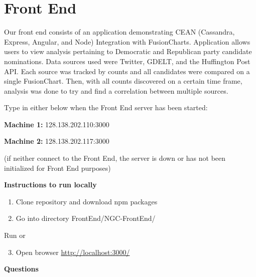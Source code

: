 \documentclass[letterpaper,12pt,english]{sphinxmanual}
\begin{document}
\section{Front End}
\label{frontEnd:front-end}\label{frontEnd::doc}
Our front end consists of an application demonstrating CEAN (Cassandra, Express, Angular, and Node) Integration with FusionCharts. Application allows users to view analysis pertaining to Democratic and Republican party candidate nominations. Data sources used were Twitter, GDELT, and the Huffington Post API. Each source was tracked by counts and all candidates were compared on a single FusionChart. Then, with all counts discovered on a certain time frame, analysis was done to try and find a correlation between multiple sources.

Type in either below when the Front End server has been started:

\begin{DUlineblock}{0em}
\item[] \textbf{Machine 1:} 128.138.202.110:3000
\item[] \textbf{Machine 2:} 128.138.202.117:3000
\end{DUlineblock}

(if neither connect to the Front End, the server is down or has not been initialized for Front End purposes)

\textbf{Instructions to run locally}
\begin{enumerate}
\item {} 
Clone repository and download npm packages
\begin{quote}



\end{quote}

\item {} 
Go into directory FrontEnd/NGC-FrontEnd/

\end{enumerate}

Run  or 
\begin{enumerate}
\setcounter{enumi}{2}
\item {} 
Open browser \href{http://localhost:3000/}{http://localhost:3000/}

\end{enumerate}

\textbf{Questions}
\end{document}

